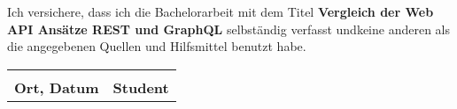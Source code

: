 Ich versichere, dass ich die Bachelorarbeit mit dem Titel {\bfseries Vergleich der Web API Ansätze REST und GraphQL} selbständig verfasst undkeine anderen als die angegebenen Quellen und Hilfsmittel benutzt habe.

\begin{table}[h]
	\centering
	\begin{tabularx}{\textwidth}{ Y Y }
		\dotfill & \dotfill \\
		{\textbf{Ort, Datum}}            & {\textbf{Student}}               \\
	\end{tabularx}
\end{table}